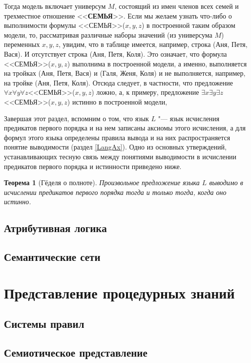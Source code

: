 \documentclass[b5paper,11pt]{book}
\newtheorem{Th}{Теорема}
\begin{document}
	Тогда модель включает универсум $M$, состоящий из имен членов всех семей и трехместное отношение <<\textbf{СЕМЬЯ}>>. Если мы желаем узнать что-либо о выполнимости формулы <<СЕМЬЯ>>($x,y,z$) в построенной таким образом модели, то, рассматривая различные наборы значений (из универсума $M$) переменных $x,y,z$, увидим, что в таблице имеется, например, строка (Аня, Петя, Вася). И отсутствует строка (Аня, Петя, Коля). Это означает, что формула <<СЕМЬЯ>>($x,y,z$) выполнима  в построенной модели, а именно, выполняется на тройках (Аня, Петя, Вася) и (Галя, Женя, Коля) и не выполняется, например, на тройке (Аня, Петя, Коля). Отсюда следует, в частности, что предложение $\forall x\forall y\forall z$<<СЕМЬЯ>>($x,y,z$) ложно, а, к примеру, предложение $\exists x\exists y \exists z$<<СЕМЬЯ>>($x,y,z$) истинно в построенной модели,
	
	Завершая этот раздел, вспомним о том, что язык $L$ "--- язык исчисления предикатов первого порядка и на нем записаны аксиомы этого исчисления, а для формул этого языка определены правила вывода и на них распространяется понятие выводимости (раздел \ref{LangAx}). Одно из основных утверждений, устанавливающих тесную связь между понятиями выводимости в исчислении предикатов первого порядка и истинности приведено ниже. 
	
	\begin{Th}[Гёделя о полноте]
		Произвольное предложение языка $L$ выводимо в исчислении предикатов первого порядка тогда и только тогда, когда оно истинно.
	\end{Th}
	
	\section{Атрибутивная логика}
	\section{Семантические сети}
	


	\chapter{Представление процедурных знаний}
	
	\section{Системы правил}\label{sect_rules}
	\section{Семиотическое представление}
	
\end{document}

